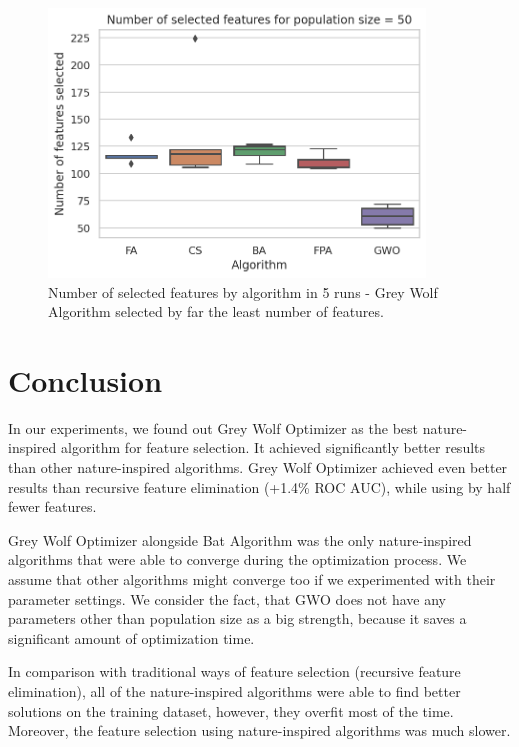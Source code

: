 \documentclass[runningheads]{llncs}
\begin{document}
\begin{figure}[h!]
	\begin{center}
	    \includegraphics[width=10cm]{figures/nia_selected_features_by_algorithm.png}
    \end{center}
	\caption{Number of selected features by algorithm in 5 runs - Grey Wolf Algorithm selected by far the least number of features.}
	\label{fig:nia_selected_features_by_algorithm}
\end{figure}

\newpage

\section{Conclusion}

In our experiments, we found out Grey Wolf Optimizer as the best nature-inspired algorithm for feature selection. It achieved significantly better results than other nature-inspired algorithms. Grey Wolf Optimizer achieved even better results than recursive feature elimination (+1.4\% ROC AUC), while using by half fewer features.

Grey Wolf Optimizer alongside Bat Algorithm was the only nature-inspired algorithms that were able to converge during the optimization process. We assume that other algorithms might converge too if we experimented with their parameter settings. We consider the fact, that GWO does not have any parameters other than population size as a big strength, because it saves a significant amount of optimization time.

In comparison with traditional ways of feature selection (recursive feature elimination), all of the nature-inspired algorithms were able to find better solutions on the training dataset, however, they overfit most of the time. Moreover, the feature selection using nature-inspired algorithms was much slower.



\end{document}
